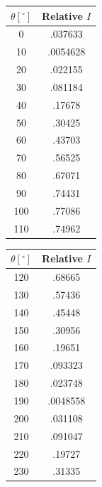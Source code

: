 \documentclass[
	letterpaper, %
	10pt, %
]{CSUniSchoolLabReport}
\begin{document}
\begin{center}
  \begin{tabular}[H]{|c|c|}
    \hline
    $\theta[^{\circ}]$ & Relative $I$\\
    \hline
    0 & .037633\\
    \hline
    10 & .0054628\\
    \hline
    20 & .022155\\
    \hline
    30 & .081184\\
    \hline
    40 & .17678\\
    \hline
    50 & .30425\\
    \hline
    60 & .43703\\
    \hline
    70 & .56525\\
    \hline
    80 & .67071\\
    \hline
    90 & .74431\\
    \hline
    100 & .77086\\
    \hline
    110 & .74962\\
    \hline
  \end{tabular}
\end{center}

\begin{center}
  \begin{tabular}[H]{|c|c|}
    \hline
    $\theta[^{\circ}]$ & Relative $I$\\
    \hline
    120 & .68665\\
    \hline
    130 & .57436\\
    \hline
    140 & .45448\\
    \hline
    150 & .30956\\
    \hline
    160 & .19651\\
    \hline
    170 & .093323\\
    \hline
    180 & .023748\\
    \hline
    190 & .0048558\\
    \hline
    200 & .031108\\
    \hline
    210 & .091047\\
    \hline
    220 & .19727\\
    \hline
    230 & .31335\\
    \hline
  \end{tabular}
\end{center}
\end{document}
